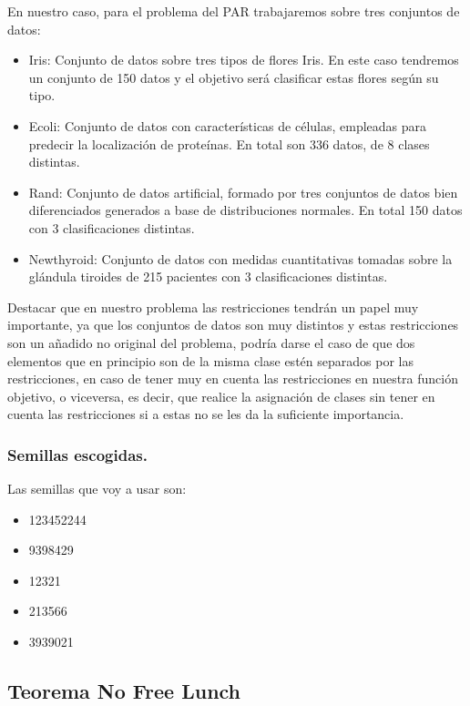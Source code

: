 \documentclass[12pt, spanish]{article}
\begin{document}
En nuestro caso, para el problema del PAR trabajaremos sobre tres conjuntos de datos:

\begin{itemize}
	\item{Iris: Conjunto de datos sobre tres tipos de flores Iris. En este caso tendremos un conjunto de 150 datos y el objetivo será clasificar estas flores según su tipo.}
	\item{Ecoli: Conjunto de datos con características de células, empleadas para predecir la localización de proteínas. En total son 336 datos, de 8 clases distintas.}
	\item{Rand: Conjunto de datos artificial, formado por tres conjuntos de datos bien diferenciados generados a base de distribuciones normales. En total 150 datos con 3 clasificaciones distintas.}
	\item{Newthyroid: Conjunto de datos con medidas cuantitativas tomadas sobre la glándula tiroides de 215 pacientes con 3 clasificaciones distintas.} 
\end{itemize}

Destacar que en nuestro problema las restricciones tendrán un papel muy importante, ya que los conjuntos de datos son muy distintos y estas restricciones son un añadido no original del problema, podría darse el caso de que dos elementos que en principio son de la misma clase estén separados por las restricciones, en caso de tener muy en cuenta las restricciones en nuestra función objetivo, o viceversa, es decir, que realice la asignación de clases sin tener en cuenta las restricciones si a estas no se les da la suficiente importancia.


\subsubsection{Semillas escogidas.}

Las semillas que voy a usar son:

\begin{itemize}
	\item {123452244}
	\item {9398429}
	\item {12321}
	\item {213566}
	\item {3939021}
\end{itemize}

\subsection{Teorema No Free Lunch}
\end{document}
